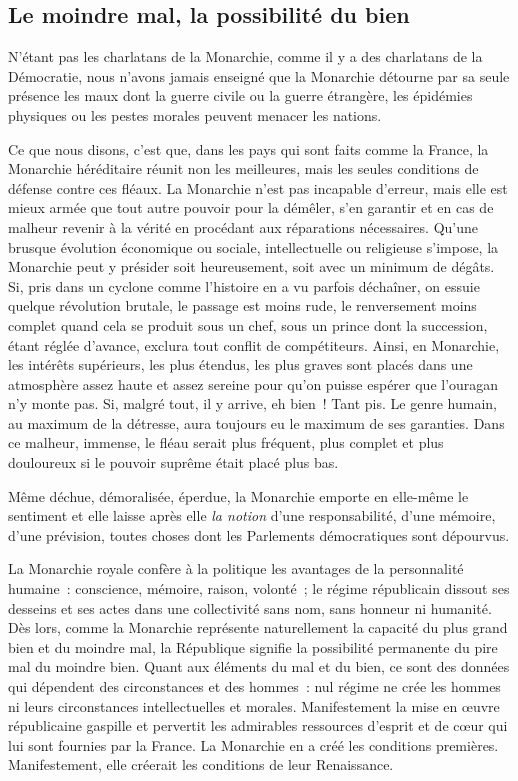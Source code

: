 \documentclass[french,twoside]{book} %
\newcommand{\astermono}{\medskip\centerline{\color{rubric}\large\selectfont{\syms ✻}}\medskip\par}%
\begin{document}
\subsection[Le moindre mal, la possibilité du bien]{Le moindre mal, la possibilité du bien}
\noindent N’étant pas les charlatans de la Monarchie, comme il y a des charlatans de la Démocratie, nous n’avons jamais enseigné que la Monarchie détourne par sa seule présence les maux dont la guerre civile ou la guerre étrangère, les épidémies physiques ou les pestes morales peuvent menacer les nations.\par
Ce que nous disons, c’est que, dans les pays qui sont faits comme la France, la Monarchie héréditaire réunit non les meilleures, mais les seules conditions de défense contre ces fléaux. La Monarchie n’est pas incapable d’erreur, mais elle est mieux armée que tout autre pouvoir pour la démêler, s’en garantir et en cas de malheur revenir à la vérité en procédant aux réparations nécessaires. Qu’une brusque évolution économique ou sociale, intellectuelle ou religieuse s’impose, la Monarchie peut y présider soit heureusement, soit avec un minimum de dégâts. Si, pris dans un cyclone comme l’histoire en a vu parfois déchaîner, on essuie quelque révolution brutale, le passage est moins rude, le renversement moins complet quand cela se produit sous un chef, sous un prince dont la succession, étant réglée d’avance, exclura tout conflit de compétiteurs. Ainsi, en Monarchie, les intérêts supérieurs, les plus étendus, les plus graves sont placés dans une atmosphère assez haute et assez sereine pour qu’on puisse espérer que l’ouragan n’y monte pas. Si, malgré tout, il y arrive, eh bien ! Tant pis. Le genre humain, au maximum de la détresse, aura toujours eu le maximum de ses garanties. Dans ce malheur, immense, le fléau serait plus fréquent, plus complet et plus douloureux si le pouvoir suprême était placé plus bas.\par

\astermono

\noindent Même déchue, démoralisée, éperdue, la Monarchie emporte en elle-même le sentiment et elle laisse après elle \emph{la notion} d’une responsabilité, d’une mémoire, d’une prévision, toutes choses dont les Parlements démocratiques sont dépourvus.\par
La Monarchie royale confère à la politique les avantages de la personnalité humaine : conscience, mémoire, raison, volonté ; le régime républicain dissout ses desseins et ses actes dans une collectivité sans nom, sans honneur ni humanité. Dès lors, comme la Monarchie représente naturellement la capacité du plus grand bien et du moindre mal, la République signifie la possibilité permanente du pire mal du moindre bien. Quant aux éléments du mal et du bien, ce sont des données qui dépendent des circonstances et des hommes : nul régime ne crée les hommes ni leurs circonstances intellectuelles et morales. Manifestement la mise en œuvre républicaine gaspille et pervertit les admirables ressources d’esprit et de cœur qui lui sont fournies par la France. La Monarchie en a créé les conditions premières. Manifestement, elle créerait les conditions de leur Renaissance.\par
\end{document}
